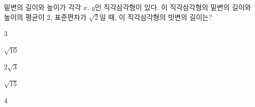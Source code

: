밑변의 길이와 높이가 각각 $x$, $y$인 직각삼각형이 있다. 이 직각삼각형의 밑변의 길이와 높이의 평균이 2, 표준편차가 $\sqrt{2}$일 때, 이 직각삼각형의 빗변의 길이는?
\begin{choices32}{\rule[-3ex]{0pt}{8ex}$3$}{\rule[-3ex]{0pt}{8ex}$\sqrt{10}$}{\rule[-3ex]{0pt}{8ex}$2\sqrt{3}$}{\rule[-3ex]{0pt}{8ex}$\sqrt{15}$}{\rule[-3ex]{0pt}{8ex}$4$}\end{choices32}
